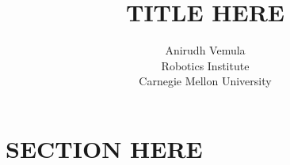 \documentclass[12pt]{article}
\title{%
\textbf{TITLE HERE}
}
\author{
  Anirudh Vemula \\
  Robotics Institute \\
  Carnegie Mellon University
}
\begin{document}
\maketitle
\bigskip

\section{SECTION HERE}
\label{sec:section-here}


%

\clearpage




\clearpage
\appendix

%
\end{document}
